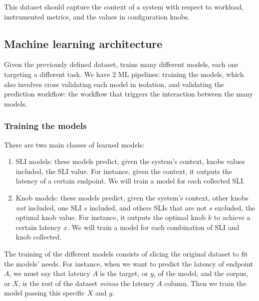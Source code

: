 This dataset should capture the context of a system with respect to workload, instrumented metrics, and the values in configuration knobs.  

\subsection{Machine learning architecture}

Given the previously defined dataset, \projectname{} trains many different models, each one targeting a different task. We have 2 ML pipelines: training the models, which also involves cross validating each model in isolation, and validating the prediction workflow: the workflow that triggers the interaction between the many models.

\subsubsection{Training the models}

There are two main classes of learned models:

\begin{enumerate}
  \item SLI models: these models predict, given the system's context, knobs values included, the SLI value. For instance, given the context, it outputs the latency of a certain endpoint. We will train a model for each collected SLI.
  \item Knob models: these models predict, given the system's context, other knobs \textit{not} included, one SLI $s$ included, and others SLIs that are not $s$ excluded, the optimal knob value. For instance, it outputs the optimal knob $k$ to achieve a certain latency $x$. We will train a model for each combination of SLI and knob collected.
\end{enumerate}

The training of the different models consists of slicing the original dataset to fit the models' needs. For instance, when we want to predict the latency of endpoint $A$, we must say that latency $A$ is the target, or $y$, of the model, and the corpus, or $X$, is the rest of the dataset \textit{minus} the latency $A$ column. Then we train the model passing this specific $X$ and $y$.

